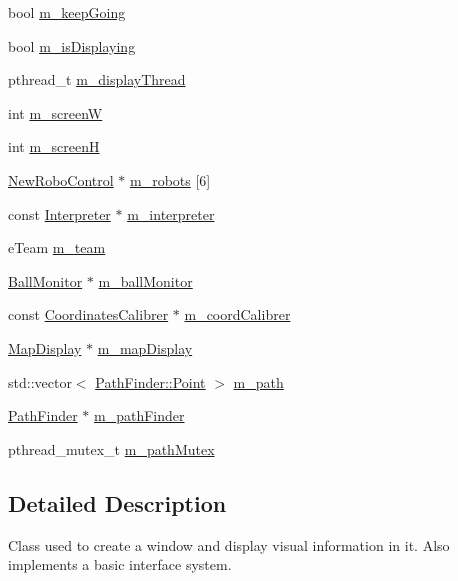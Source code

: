 \begin{DoxyCompactItemize}
\item 
bool \hyperlink{classRefereeDisplay_af3bb14682e53eef2d7d9e664f84e6ba1}{m\_\-keepGoing}
\item 
bool \hyperlink{classRefereeDisplay_a12bdb098bcf59351f55bc7beb922ac62}{m\_\-isDisplaying}
\item 
pthread\_\-t \hyperlink{classRefereeDisplay_aded3908927ad3726777ece4d52cf3ca2}{m\_\-displayThread}
\item 
int \hyperlink{classRefereeDisplay_aed7aa88d65bc9b4f79fe8dd2598a92e5}{m\_\-screenW}
\item 
int \hyperlink{classRefereeDisplay_a136af0a18d0eadffbcaa755fdf76e328}{m\_\-screenH}
\item 
\hyperlink{classNewRoboControl}{NewRoboControl} $\ast$ \hyperlink{classRefereeDisplay_a4a777a38327f96fe1e5c9051b6c3c38f}{m\_\-robots} \mbox{[}6\mbox{]}
\item 
const \hyperlink{classInterpreter}{Interpreter} $\ast$ \hyperlink{classRefereeDisplay_a510383c894f917032aadc71f1f31074f}{m\_\-interpreter}
\item 
eTeam \hyperlink{classRefereeDisplay_a02ec6cdc79904b4727553f6802c36d9e}{m\_\-team}
\item 
\hyperlink{classBallMonitor}{BallMonitor} $\ast$ \hyperlink{classRefereeDisplay_ab3a1d764a476c413ed1f19be2c9a1215}{m\_\-ballMonitor}
\item 
const \hyperlink{classCoordinatesCalibrer}{CoordinatesCalibrer} $\ast$ \hyperlink{classRefereeDisplay_a7be832637684b08b915a2ff3c6c0d9f2}{m\_\-coordCalibrer}
\item 
\hyperlink{classMapDisplay}{MapDisplay} $\ast$ \hyperlink{classRefereeDisplay_a07fda892af04771c6484160fb0e5585f}{m\_\-mapDisplay}
\item 
std::vector$<$ \hyperlink{structPathFinder_1_1Point}{PathFinder::Point} $>$ \hyperlink{classRefereeDisplay_a582b6bcc0204a2876b629e8ceebc8abd}{m\_\-path}
\item 
\hyperlink{classPathFinder}{PathFinder} $\ast$ \hyperlink{classRefereeDisplay_a0ccee8231a72e1a906dff856e072d5a0}{m\_\-pathFinder}
\item 
pthread\_\-mutex\_\-t \hyperlink{classRefereeDisplay_a2ec44bb3c993cb8e518a730153116da7}{m\_\-pathMutex}
\end{DoxyCompactItemize}


\subsection{Detailed Description}
Class used to create a window and display visual information in it. Also implements a basic interface system. 

